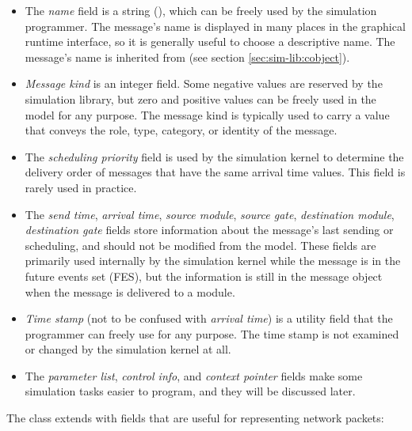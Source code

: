 \begin{itemize}
  \item The \textit{name} field is a string (),
    which can be freely used by the simulation programmer. The message's
    name is displayed in many places in the graphical runtime interface,
    so it is generally useful to choose a descriptive name. The message's
    name is inherited from  (see section
    \ref{sec:sim-lib:cobject}).
  \item \textit{Message kind} is an integer field.
    Some negative values are reserved by the simulation library, but zero
    and positive values can be freely used in the model for any purpose.
    The message kind is typically used to carry a value that conveys the
    role, type, category, or identity of the message.
  \item The \textit{scheduling priority} field is used by the simulation
    kernel to determine the delivery order of messages that have the same
    arrival time values. This field is rarely used in practice.
  \item The \textit{send time}, \textit{arrival time}, \textit{source module},
    \textit{source gate}, \textit{destination module}, \textit{destination gate}
    fields store information about the message's last sending or scheduling,
    and should not be modified from the model. These fields are primarily
    used internally by the simulation kernel while the message is in the
    future events set (FES), but the information is still in
    the message object when the message is delivered to a module.
  \item \textit{Time stamp} (not to be confused with \textit{arrival time})
    is a utility field that the programmer can freely use for any purpose.
    The time stamp is not examined or changed by the simulation kernel at all.
  \item The \textit{parameter list}, \textit{control info}, and
    \textit{context pointer} fields make some simulation tasks easier
    to program, and they will be discussed later.
\end{itemize}

The  class extends  with fields that are
useful for representing network packets:

